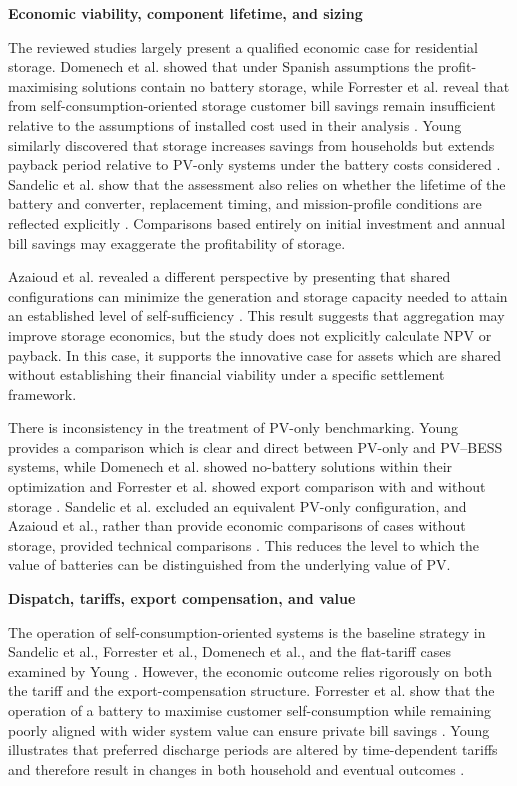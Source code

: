 \noindent\textbf{Economic viability, component lifetime, and sizing}\par

The reviewed studies largely present a qualified economic case for
residential storage. Domenech et al. showed that under Spanish assumptions the profit-maximising solutions contain no battery storage, while
Forrester et al. reveal that from self-consumption-oriented storage customer bill savings remain insufficient relative to the assumptions of
installed cost used in their analysis
\cite{ch2ref031,ch2ref062}. Young similarly discovered that storage increases savings from households but extends payback period relative to PV-only systems
under the battery costs considered \cite{ch2ref066}. Sandelic et al.
show that the assessment also relies on whether the lifetime of the battery and
converter, replacement timing, and mission-profile conditions
are reflected explicitly \cite{ch2ref002}. Comparisons
based entirely on initial investment and annual bill savings may exaggerate
the profitability of storage.

Azaioud et al. revealed a different perspective by presenting that shared
configurations can minimize the generation and storage capacity needed
to attain an established level of self-sufficiency \cite{ch2ref051}. This result
suggests that aggregation may improve storage economics, but the study
does not explicitly calculate NPV or payback. In this case, it supports the innovative case for assets which are shared without establishing their financial viability under a specific settlement framework.

There is inconsistency in the treatment of PV-only benchmarking. Young
provides a comparison which is clear and direct between PV-only and PV--BESS
systems, while Domenech et al. showed no-battery solutions within their optimization and Forrester et al. showed export comparison with and without storage \cite{ch2ref031,ch2ref062,ch2ref066}. Sandelic et al. excluded an equivalent PV-only configuration, and Azaioud et al., rather than provide economic comparisons of cases without storage, provided technical comparisons
\cite{ch2ref002,ch2ref051}. This reduces the level to which the value of batteries can be distinguished from the underlying value of PV.

\noindent\textbf{Dispatch, tariffs, export compensation, and value}\par

The operation of self-consumption-oriented systems is the baseline strategy in
Sandelic et al., Forrester et al., Domenech et al., and the flat-tariff
cases examined by Young
\cite{ch2ref002,ch2ref031,ch2ref062,ch2ref066}. However, the economic
outcome relies rigorously on both the tariff and the export-compensation
structure. Forrester et al. show that the operation of a battery to maximise
customer self-consumption while remaining poorly aligned with wider system value can ensure private bill savings  \cite{ch2ref031}.
Young illustrates that preferred discharge periods are altered by time-dependent tariffs and therefore result in changes in both household and eventual
outcomes \cite{ch2ref066}.

